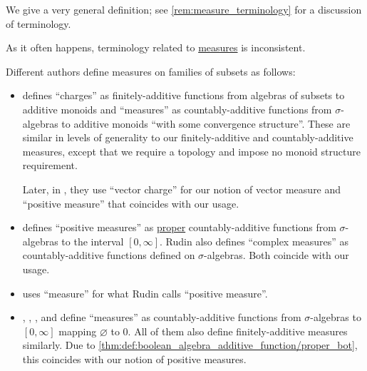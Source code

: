 \begin{comments}
  \item We give a very general definition; see \cref{rem:measure_terminology} for a discussion of terminology.
\end{comments}

\begin{remark}\label{rem:measure_terminology}
  As it often happens, terminology related to \hyperref[def:measure]{measures} is inconsistent.

  Different authors define measures on families of subsets as follows:
  \begin{itemize}
    \item {} defines \enquote{charges} as finitely-additive functions from algebras of subsets to additive monoids and \enquote{measures} as countably-additive functions from \( \sigma \)-algebras to additive monoids \enquote{with some convergence structure}. These are similar in levels of generality to our finitely-additive and countably-additive measures, except that we require a topology and impose no monoid structure requirement.

    Later, in \cite[\S 11.41]{Schechter1997AnalysisHandbook}, they use \enquote{vector charge} for our notion of vector measure and \enquote{positive measure} that coincides with our usage.

    \item {} defines \enquote{positive measures} as \hyperref[def:effective_domain]{proper} countably-additive functions from \( \sigma \)-algebras to the interval \( [0, \infty] \). Rudin also defines \enquote{complex measures} as countably-additive functions defined on \( \sigma \)-algebras. Both coincide with our usage.

    \item {} uses \enquote{measure} for what Rudin calls \enquote{positive measure}.

    \item {}, , ,  and  define \enquote{measures} as countably-additive functions from \( \sigma \)-algebras to \( [0, \infty] \) mapping \( \varnothing \) to \( 0 \). All of them also define finitely-additive measures similarly. Due to \cref{thm:def:boolean_algebra_additive_function/proper_bot}, this coincides with our notion of positive measures.


\end{itemize}
\end{remark}
